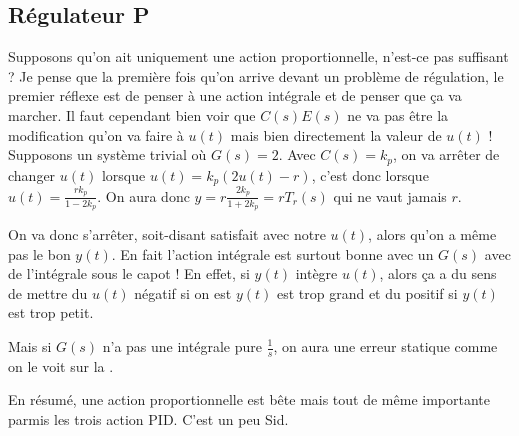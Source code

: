 \subsection{Régulateur P}
Supposons qu'on ait uniquement une action proportionnelle,
n'est-ce pas suffisant ?
Je pense que la première fois qu'on arrive devant un problème de régulation,
le premier réflexe est de penser à une action intégrale et de penser que ça va marcher.
Il faut cependant bien voir que $C(s)E(s)$ ne va pas être la modification qu'on va faire
à $u(t)$ mais bien directement la valeur de $u(t)$ !
Supposons un système trivial où $G(s) = 2$.
Avec $C(s) = k_p$, on va arrêter de changer $u(t)$ lorsque
$u(t) = k_p(2u(t) - r)$, c'est donc lorsque
$u(t) = \frac{rk_p}{1 - 2k_p}$.
On aura donc $y = r\frac{2k_p}{1+2k_p}=rT_r(s)$ qui ne vaut
jamais $r$.

On va donc s'arrêter, soit-disant satisfait avec notre $u(t)$,
alors qu'on a même pas le bon $y(t)$.
En fait l'action intégrale est surtout bonne avec un $G(s)$
avec de l'intégrale sous le capot !
En effet, si $y(t)$ intègre $u(t)$, alors ça a du sens de mettre
du $u(t)$ négatif si on est $y(t)$ est trop grand et du positif
si $y(t)$ est trop petit.

Mais si $G(s)$ n'a pas une intégrale pure $\frac{1}{s}$, on aura
une erreur statique comme on le voit sur la .

En résumé, une action proportionnelle est bête mais tout de même
importante parmis les trois action PID.
C'est un peu Sid.

